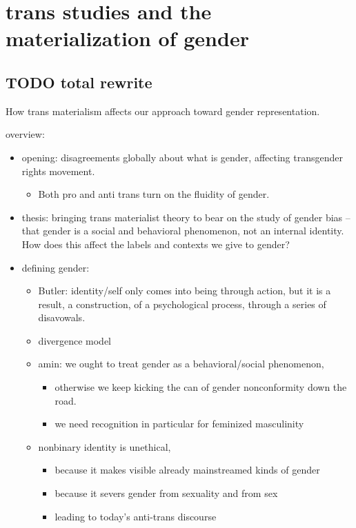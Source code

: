\documentclass[11pt]{article}
\author{fcalado}
\date{\today}
\title{}
\begin{document}
\tableofcontents

\section{trans studies and the materialization of gender}
\label{sec:org6072b63}
\subsection{{\bfseries\sffamily TODO} total rewrite}
\label{sec:org14e806d}
How trans materialism affects our approach toward gender
representation.

overview:
\begin{itemize}
\item[{$\boxtimes$}] opening: disagreements globally about what is gender, affecting
transgender rights movement. 
\begin{itemize}
\item Both pro and anti trans turn on the fluidity of gender.
\end{itemize}
\item thesis: bringing trans materialist theory to bear on the study of
gender bias -- that gender is a social and behavioral phenomenon,
not an internal identity. How does this affect the labels and
contexts we give to gender?
\item defining gender:
\begin{itemize}
\item[{$\boxtimes$}] Butler: identity/self only comes into being through action, but it
is a result, a construction, of a psychological process, through a
series of disavowals.
\item[{$\boxtimes$}] divergence model
\item[{$\square$}] amin: we ought to treat gender as a behavioral/social phenomenon,
\begin{itemize}
\item otherwise we keep kicking the can of gender nonconformity down the
road.
\item we need recognition in particular for feminized masculinity
\end{itemize}
\item nonbinary identity is unethical,
\begin{itemize}
\item because it makes visible already mainstreamed kinds of gender
\item because it severs gender from sexuality and from sex
\item leading to today's anti-trans discourse

\end{itemize}
\end{itemize}
\end{itemize}
\end{document}
